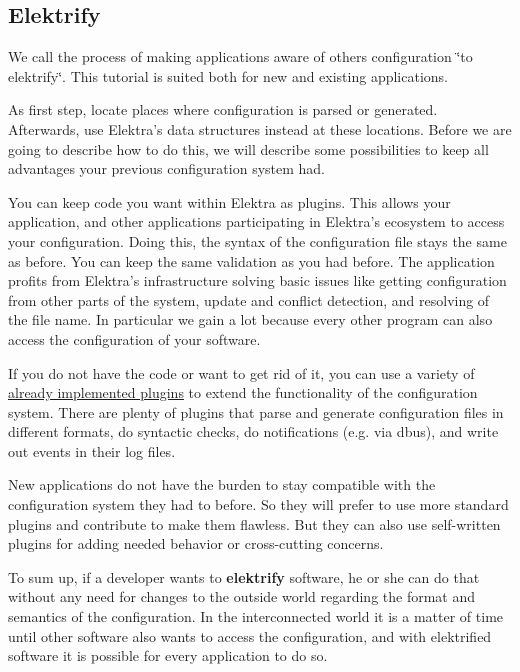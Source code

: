 \subsection*{Elektrify}

We call the process of making applications aware of other\textquotesingle{}s configuration \char`\"{}to elektrify\char`\"{}. This tutorial is suited both for new and existing applications.

As first step, locate places where configuration is parsed or generated. Afterwards, use Elektra’s data structures instead at these locations. Before we are going to describe how to do this, we will describe some possibilities to keep all advantages your previous configuration system had.

You can keep code you want within Elektra as plugins. This allows your application, and other applications participating in Elektra’s ecosystem to access your configuration. Doing this, the syntax of the configuration file stays the same as before. You can keep the same validation as you had before. The application profits from Elektra’s infrastructure solving basic issues like getting configuration from other parts of the system, update and conflict detection, and resolving of the file name. In particular we gain a lot because every other program can also access the configuration of your software.

If you do not have the code or want to get rid of it, you can use a variety of \hyperlink{md_src_plugins_README_src_plugins_README_md}{already implemented plugins} to extend the functionality of the configuration system. There are plenty of plugins that parse and generate configuration files in different formats, do syntactic checks, do notifications (e.\+g. via dbus), and write out events in their log files.

New applications do not have the burden to stay compatible with the configuration system they had to before. So they will prefer to use more standard plugins and contribute to make them flawless. But they can also use self-\/written plugins for adding needed behavior or cross-\/cutting concerns.

To sum up, if a developer wants to {\bfseries elektrify} software, he or she can do that without any need for changes to the outside world regarding the format and semantics of the configuration. In the interconnected world it is a matter of time until other software also wants to access the configuration, and with elektrified software it is possible for every application to do so.

